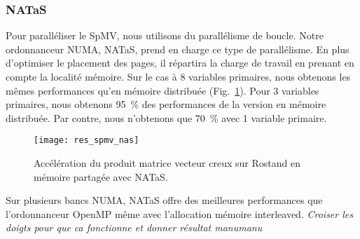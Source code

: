 \subsubsection{NATaS}
Pour paralléliser le SpMV, nous utilisons du parallélisme de boucle.
%
Notre ordonnanceur NUMA, NATaS, prend en charge ce type de parallélisme.
%
En plus d'optimiser le placement des pages, il répartira la charge de travail en prenant en compte la localité mémoire.
%
Sur le cas à 8 variables primaires, nous obtenons les mêmes performances qu'en mémoire distribuée (Fig.~\ref{fig:res_spmv_nas}).
%
Pour 3 variables primaires, nous obtenons 95~\% des performances de la version en mémoire distribuée.
%
Par contre, nous n'obtenons que 70~\% avec 1 variable primaire.

\begin{figure}[t!]
  \centering
  \texttt{[image: res\_spmv\_nas]}
  \caption{Accélération du produit matrice vecteur creux sur Rostand en mémoire partagée avec NATaS.}
  \label{fig:res_spmv_nas}
\end{figure}



Sur plusieurs bancs NUMA, NATaS offre des meilleures performances que l'ordonnanceur OpenMP même avec l'allocation mémoire interleaved.
%
{\em Croiser les doigts pour que ca fonctionne et donner résultat manumanu}
%
